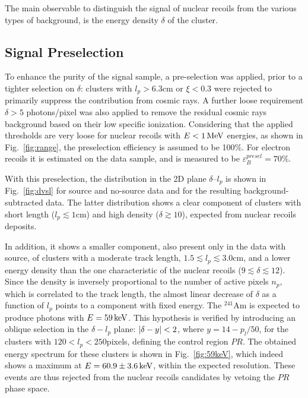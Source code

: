 The main observable to distinguish the signal of nuclear recoils from
the various types of background, is the energy density $\delta$ of the
cluster.

\subsection{Signal Preselection}
To enhance the purity of the signal sample, a pre-selection was
applied, prior to a tighter selection on $\delta$: clusters with
$l_p>6.3$\unit{cm} or $\xi<0.3$ were rejected to primarily suppress
the contribution from cosmic rays. A further loose requirement
$\delta>5$ photons/pixel was also applied to remove the residual
cosmic rays background based on their low specific
ionization. Considering that the applied thresholds are very loose for
nuclear recoils with $E<1\,\textrm{Me\hspace{-.08em}V}$ energies, as shown in
Fig.~\ref{fig:range}, the preselection efficiency is assumed to be
100\%. For electron recoils it is estimated on the \fe data sample,
and is measured to be $\varepsilon_{B}^{presel}=70\%$.

With this preselection, the distribution in the 2D plane
$\delta$--$l_p$ is shown in Fig.~\ref{fig:dvsl} for \ambe source and
no-source data and for the resulting background-subtracted \ambe data.
The latter distribution shows a clear component of clusters with short
length ($l_p\lesssim1$\unit{cm}) and high density ($\delta\gtrsim
10$), expected from nuclear recoils deposits.

In addition, it shows a smaller component, also present only in the
data with \ambe source, of clusters with a moderate track length,
$1.5 \lesssim l_p \lesssim 3.0$\unit{cm}, and a lower energy density
than the one characteristic of the nuclear recoils
($9\lesssim\delta\lesssim12$). Since the density is inversely
proportional to the number of active pixels $n_p$, which is correlated
to the track length, the almost linear decrease of $\delta$ as a
function of $l_p$ points to a component with fixed energy. The
$^{241}$Am is expected to produce photons with $E=59\,\textrm{ke\hspace{-.08em}V}$. This
hypothesis is verified by introducing an oblique selection in the
$\delta-l_p$ plane: $\vert \delta-y \vert<2$, where $y=14-p_l/50$, for the
clusters with $120<l_p<250$\unit{pixels}, defining the control region
$PR$. The obtained energy spectrum for these clusters is shown in
Fig.~\ref{fig:59keV}, which indeed shows a maximum at
$E=60.9\pm3.6\,\textrm{ke\hspace{-.08em}V}$, within the expected resolution. These events are
thus rejected from the nuclear recoils candidates by vetoing the $PR$
phase space.

